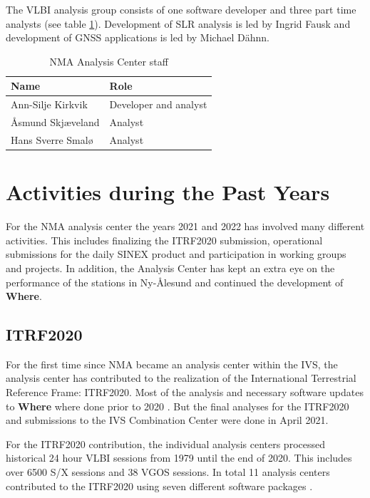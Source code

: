 \documentclass[twocolumn,twoside]{svmultivs_br} %
\begin{document}
The VLBI analysis group consists of one 
software developer and three part time analysts (see table \ref{tab:staff}).
Development of SLR analysis is led by Ingrid Fausk and development of GNSS applications is led by Michael D\"ahnn.

\begin{table}[htb!]
\caption{NMA Analysis Center staff}
\begin{center}
\begin{tabularx}{\linewidth}{X|X}
\hline
Name  & Role \\
\hline
Ann-Silje Kirkvik & Developer and analyst \\
\AA smund Skj\ae veland & Analyst \\
Hans Sverre Smal\o & Analyst \\
\hline
\end{tabularx}
\end{center}
\label{tab:staff}
\end{table}

\section{Activities during the Past Years}
For the NMA analysis center the years 2021 and 2022 has involved many different activities. This includes
finalizing the ITRF2020 submission, operational submissions for the daily SINEX product and participation 
in working groups and projects. In addition, the Analysis Center has kept an extra eye on the performance of the 
stations in Ny-\AA lesund and continued the development of \textbf{Where}.

\subsection{ITRF2020}
For the first time since NMA became an analysis center within the IVS, the analysis center has contributed to 
the realization of the International Terrestrial Reference Frame: ITRF2020. Most of the analysis and necessary 
software updates to \textbf{Where} where done prior to 2020 \cite{biennial-acnma2019}. But 
the final analyses for the ITRF2020 and submissions to the IVS Combination Center were done in April 2021.  

For the ITRF2020 contribution, the individual analysis centers processed historical 24 hour VLBI sessions 
from 1979 until the end of 2020. This includes over 6500 S/X sessions and 38 VGOS sessions. In total 11 
analysis centers contributed to the ITRF2020 using seven different software packages \cite{evga-itrf2020}.
\end{document}
